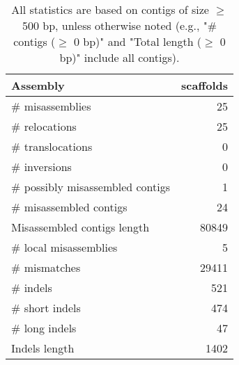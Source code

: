 \documentclass[12pt,a4paper]{article}
\begin{document}
\begin{table}[ht]
\begin{center}
\caption{All statistics are based on contigs of size $\geq$ 500 bp, unless otherwise noted (e.g., "\# contigs ($\geq$ 0 bp)" and "Total length ($\geq$ 0 bp)" include all contigs).}
\begin{tabular}{|l*{1}{|r}|}
\hline
Assembly & scaffolds \\ \hline
\# misassemblies & 25 \\ \hline
\hspace{5mm}\# relocations & 25 \\ \hline
\hspace{5mm}\# translocations & 0 \\ \hline
\hspace{5mm}\# inversions & 0 \\ \hline
\# possibly misassembled contigs & 1 \\ \hline
\# misassembled contigs & 24 \\ \hline
Misassembled contigs length & 80849 \\ \hline
\# local misassemblies & 5 \\ \hline
\# mismatches & 29411 \\ \hline
\# indels & 521 \\ \hline
\hspace{5mm}\# short indels & 474 \\ \hline
\hspace{5mm}\# long indels & 47 \\ \hline
Indels length & 1402 \\ \hline
\end{tabular}
\end{center}
\end{table}
\end{document}
